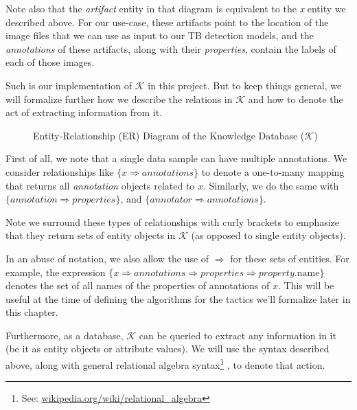 \documentclass[../main.tex]{subfiles}
\begin{document}
    Note also that the \textit{artifact} entity in that diagram is equivalent to the \textit{x} entity we described above. For our use-case, these artifacts point to the location of the image files that we can use as input to our TB detection models, and the \textit{annotations} of these artifacts, along with their \textit{properties}, contain the labels of each of those images.

    Such is our implementation of $\mathcal{K}$ in this project. But to keep things general, we will formalize further how we describe the relations in $\mathcal{K}$ and how to denote the act of extracting information from it.

    \begin{figure}[t]
        \centering
        \caption{Entity-Relationship (ER) Diagram of the Knowledge Database ($\mathcal{K}$)}
        \hspace*{-0.5cm}
        \label{fig:knowledge_db_schema}
    \end{figure}

    
    First of all, we note that a single data sample can have multiple annotations. We consider relationships like $\{x \Rightarrow annotations\}$ to denote a one-to-many mapping that returns all \textit{annotation} objects related to $x$. Similarly, we do the same with $\{annotation \Rightarrow properties\}$, and $\{annotator \Rightarrow annotations\}$. 
    
    Note we surround these types of relationships with curly brackets to emphasize that they return sets of entity objects in $\mathcal{K}$ (as opposed to single entity objects).

    In an abuse of notation, we also allow the use of $\Rightarrow$ for these sets of entities. For example, the expression $\{x \Rightarrow annotations \Rightarrow properties \Rightarrow property.\text{name}\}$ denotes the set of all names of the properties of annotations of $x$. This will be useful at the time of defining the algorithms for the tactics we'll formalize later in this chapter.

    \vspace{0.5cm}

    Furthermore, as a database, $\mathcal{K}$ can be queried to extract any information in it (be it as entity objects or attribute values). We will use the syntax described above, along with general relational algebra syntax\footnote{See: \href{https://en.wikipedia.org/wiki/Relational_algebra}{wikipedia.org/wiki/relational\_algebra}} \cite{silberschatzDatabaseSystemConcepts2011}, to denote that action.
\end{document}
